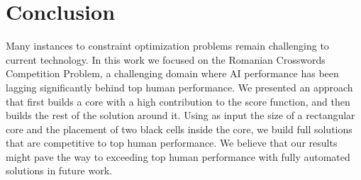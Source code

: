 \section{Conclusion}

Many instances to constraint optimization problems remain challenging to current
technology.
In this work we focused on
the Romanian Crosswords Competition Problem,
a challenging domain where AI performance has been lagging significantly behind top human performance.
We presented an approach that first builds a core with a high contribution to the score function,
and then builds the rest of the solution around it.
Using as input the size of a rectangular core and the placement of two black cells inside the core,
we build full solutions that are competitive to top human performance.
We believe that our results might pave the way to exceeding top human performance with fully automated solutions in future work.
